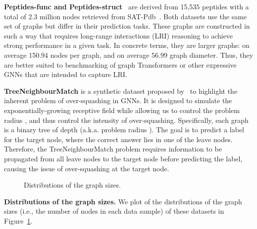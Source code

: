 \documentclass{article}
\begin{document}
{\textbf{Peptides-func and Peptides-struct}~\citep{dwivedi2022long}
are derived from 15,535 peptides with a total of 2.3 million nodes retrieved from SAT-Pdb~\citep{singh2016satpdb}. Both datasets use the same set of graphs but differ in their prediction tasks. These graphs are constructed in such a way that requires long-range interactions (LRI) reasoning to achieve strong performance in a given task. In concrete terms, they are larger graphs: on average 150.94 nodes per graph, and on average 56.99 graph diameter. Thus, they are better suited to benchmarking of graph Transformers or other expressive GNNs that are intended to capture LRI.}

\textbf{TreeNeighbourMatch} is a synthetic dataset proposed by~\citet{alon2020bottleneck} to highlight the inherent problem of over-squashing in GNNs. It is designed to simulate the exponentially-growing receptive field while allowing us to control the problem radius , and thus control the intensity of over-squashing. Specifically, each graph is a binary tree of depth  (a.k.a. problem radius ). The goal is to predict a label for the target node, where the correct answer lies in one of the leave nodes. Therefore, the TreeNeighbourMatch problem requires information to be propagated from all leave nodes to the target node before predicting the label, causing the issue of over-squashing at the target node.

\begin{figure}[!ht]
\centering     {}
\caption{Distributions of the graph sizes.}
\label{fig: Distributions of the graph sizes}
\end{figure}

\textbf{Distributions of the graph sizes.} We plot of the distributions of the graph sizes (i.e., the number of nodes in each data sample) of these datasets in Figure~\ref{fig: Distributions of the graph sizes}.
\end{document}

